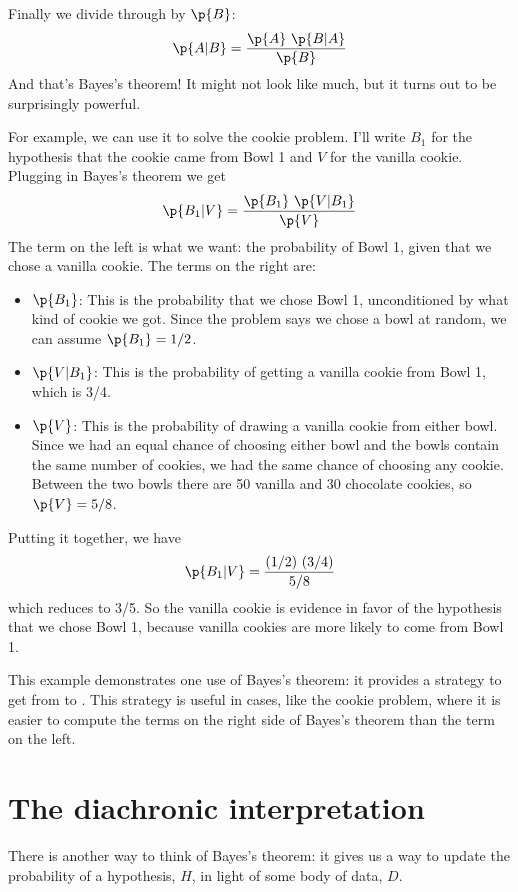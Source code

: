 \documentclass[12pt]{book}
\theoremstyle{exercise}
\begin{document}
Finally we divide through by $\p{B}$:
%
\[ \p{A|B} = \frac{\p{A}~\p{B|A}}{\p{B}} \]
%
And that's Bayes's theorem!  It might not look like much, but
it turns out to be surprisingly powerful.

For example, we can use it to solve the cookie problem.  I'll write
$B_1$ for the hypothesis that the cookie came from Bowl 1
and $V$ for the vanilla cookie.  Plugging in Bayes's theorem
we get
%
\[ \p{B_1|V} = \frac{\p{B_1}~\p{V|B_1}}{\p{V}} \]
%
The term on the left is what we want: the probability of Bowl 1, given
that we chose a vanilla cookie.  The terms on the right are:

\begin{itemize}

\item $\p{B_1}$: This is the probability that we chose Bowl 1, unconditioned by what kind of cookie we got.  Since the problem says we chose a bowl at random, we can assume $\p{B_1} = 1/2$.

\item $\p{V|B_1}$: This is the probability of getting a vanilla cookie
from Bowl 1, which is 3/4.

\item $\p{V}$: This is the probability of drawing a vanilla cookie from
either bowl.  Since we had an equal chance of choosing either bowl
and the bowls contain the same number of cookies, we had the same
chance of choosing any cookie.  Between the two bowls there are
50 vanilla and 30 chocolate cookies, so $\p{V} = 5/8$.

\end{itemize}

Putting it together, we have 
%
\[ \p{B_1|V} = \frac{(1/2)~(3/4)}{5/8} \]
%
which reduces to 3/5.  So the vanilla cookie is evidence in favor of
the hypothesis that we chose Bowl 1, because vanilla cookies are more
likely to come from Bowl 1.


This example demonstrates one use of Bayes's theorem: it provides
a strategy to get from  to .  This strategy is useful
in cases, like the cookie problem, where it is easier to compute
the terms on the right side of Bayes's theorem than the term on the
left.


\section{The diachronic interpretation}

There is another way to think of Bayes's theorem: it gives us a
way to update the probability of a hypothesis, $H$, in light of
some body of data, $D$.
\end{document}
